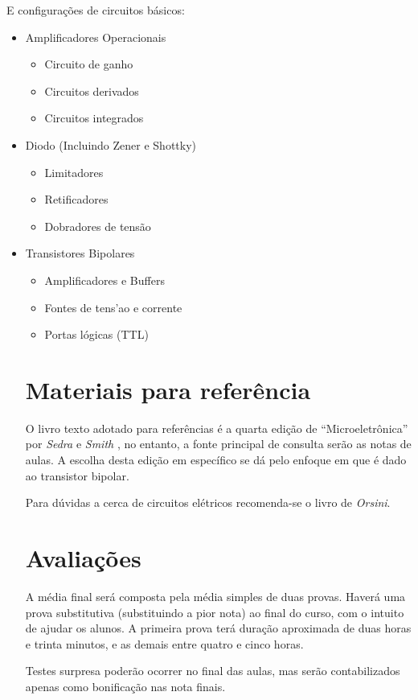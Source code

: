 E configurações de circuitos básicos:
\begin{itemize}
  \item Amplificadores Operacionais 
    \begin{itemize}
      \item Circuito de ganho
      \item Circuitos derivados 
      \item Circuitos integrados
    \end{itemize}
  \item Diodo (Incluindo Zener e Shottky)
    \begin{itemize}
      \item Limitadores
      \item Retificadores
      \item Dobradores de tensão
    \end{itemize}
  \item Transistores Bipolares
    \begin{itemize}
      \item Amplificadores e Buffers
      \item Fontes de tens'ao e corrente
      \item Portas lógicas (TTL)
    \end{itemize}

    \section*{Materiais para referência}
    O livro texto adotado para referências é a quarta edição de ``Microeletrônica'' por \emph{Sedra} e \emph{Smith} \cite{sedra1998microelectronic}, 
    no entanto, a fonte principal de consulta serão as notas de aulas. A escolha desta edição em específico se dá pelo enfoque em que é dado ao 
    transistor bipolar. 
    
 Para dúvidas a cerca de circuitos elétricos recomenda-se o livro de \emph{Orsini}\cite{orsini}.

 \section*{Avaliações}
 A média final será composta pela média simples de duas provas. Haverá uma prova substitutiva (substituindo a pior nota) ao final do curso,
 com o intuito de ajudar os alunos. A primeira prova terá duração aproximada de duas horas e trinta minutos, e as demais entre quatro e cinco horas.

 Testes surpresa poderão ocorrer no final das aulas, mas serão contabilizados apenas como bonificação nas nota finais.


\end{itemize}
